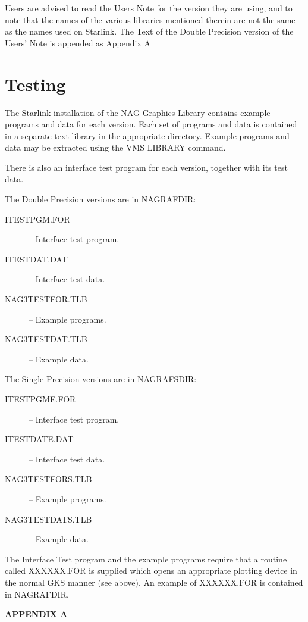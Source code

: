 Users are advised to read the Users Note for the version they are using, and to
note that the names of the various libraries mentioned therein are not the same 
as the names used on Starlink. The Text of the Double Precision version of the
Users' Note is appended as Appendix A 

\section{Testing}
The Starlink installation of the NAG Graphics Library contains example programs
and data for each version. Each set of programs and data is contained in a
separate text library in the appropriate directory. Example programs and data 
may be extracted using the VMS LIBRARY command.

There is also an interface test program for each version, together with its
test data. 

The Double Precision versions are in NAGRAFDIR:
\begin{description}
\begin{description}
\item[ITESTPGM.FOR] -- Interface test program.
\item[ITESTDAT.DAT] -- Interface test data.
\item[NAG3TESTFOR.TLB] -- Example programs.
\item[NAG3TESTDAT.TLB] -- Example data.
\end{description}
\end{description}

The Single Precision versions are in NAGRAFSDIR:
\begin{description}
\begin{description}
\item[ITESTPGME.FOR] -- Interface test program.
\item[ITESTDATE.DAT] -- Interface test data.
\item[NAG3TESTFORS.TLB] -- Example programs.
\item[NAG3TESTDATS.TLB] -- Example data.
\end{description}
\end{description}

The Interface Test program and the example programs require that a routine
called XXXXXX.FOR is supplied which opens an appropriate plotting device in the
normal GKS manner (see above). An example of XXXXXX.FOR is contained in 
NAGRAFDIR. 

\newpage
\begin{center}
{\bf APPENDIX A}
\end {center}

